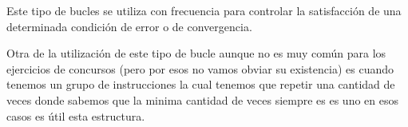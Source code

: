Este tipo de bucles se utiliza con frecuencia para controlar la satisfacción de una determinada
condición de error o de convergencia.

Otra de la utilización de este tipo de bucle aunque no es muy común para los ejercicios de concursos (pero por esos no vamos obviar su existencia) es cuando tenemos un grupo de instrucciones la cual tenemos que repetir una cantidad de veces donde sabemos que la minima cantidad de veces siempre es es uno en esos casos es útil esta estructura.